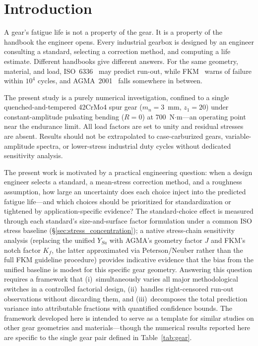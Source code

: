 \documentclass[twocolumn,12pt,a4paper]{article}
\begin{document}
\section{Introduction}
\label{sec:intro}

A gear's fatigue life is not a property of the gear. It is a property
of the handbook the engineer opens. Every industrial gearbox is designed
by an engineer consulting a standard, selecting a correction method, and
computing a life estimate. Different handbooks give different answers.
For the same geometry, material, and load, ISO~6336~\cite{iso6336} may
predict run-out, while FKM~\cite{fkm} warns of failure within $10^4$
cycles, and AGMA~2001~\cite{agma2001} falls somewhere in between.

The present study is a purely numerical investigation, confined to a
single quenched-and-tempered 42CrMo4 spur gear ($m_n=3$~mm,
$z_1=20$) under constant-amplitude pulsating bending ($R=0$) at
700~N$\cdot$m---an operating point near the endurance limit. All
load factors are set to unity and residual stresses are absent.
Results should not be extrapolated to case-carburized gears,
variable-amplitude spectra, or lower-stress industrial duty cycles
without dedicated sensitivity analysis.

The present work is motivated by a practical engineering question:
when a design engineer selects a standard, a mean-stress correction
method, and a roughness assumption, how large an uncertainty does each
choice inject into the predicted fatigue life---and which choices
should be prioritized for standardization or tightened by
application-specific evidence? The standard-choice effect is measured
through each standard's size-and-surface factor formulation under a
common ISO stress baseline (\S\ref{sec:stress_concentration}); a
native stress-chain sensitivity analysis (replacing the unified
$Y_{Sa}$ with AGMA's geometry factor $J$ and FKM's notch factor
$K_f$, the latter approximated via Peterson/Neuber rather than the
full FKM guideline procedure) provides indicative evidence that the
bias from the unified baseline is modest for this specific gear
geometry. Answering this question
requires a framework that (i)~simultaneously varies all major
methodological switches in a controlled factorial design,
(ii)~handles right-censored
run-out observations without discarding them, and (iii)~decomposes the
total prediction variance into attributable fractions with quantified
confidence bounds. The framework developed here is intended to serve as
a template for similar studies on other gear geometries and
materials---though the numerical results reported here are specific
to the single gear pair defined in Table~\ref{tab:gear}.
\end{document}
